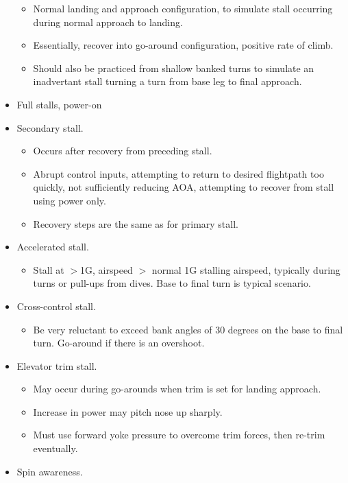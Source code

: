 \documentclass[letterpaper,10pt,titlepage]{article}
\begin{document}
\begin{itemize}
	  \begin{itemize}
	  \item Normal landing and approach configuration, to simulate stall occurring during normal approach
	        to landing.
	  \item Essentially, recover into go-around configuration, positive rate of climb.
	  \item Should also be practiced from shallow banked turns to simulate an
	        inadvertant stall turning a turn from base leg to final approach.
	  \end{itemize}
\item Full stalls, power-on
\item Secondary stall.
	  \begin{itemize}
	  \item Occurs after recovery from preceding stall.
	  \item Abrupt control inputs, attempting to return to desired flightpath too quickly,
	        not sufficiently reducing AOA, attempting to recover from stall using power only.
	  \item Recovery steps are the same as for primary stall.
	  \end{itemize}
\item Accelerated stall.
	  \begin{itemize}
	  \item Stall at $>$1G, airspeed $>$ normal 1G stalling airspeed, typically during turns or pull-ups from dives.
	        Base to final turn is typical scenario.
	  \end{itemize}
\item Cross-control stall.
	  \begin{itemize}
	  \item Be very reluctant to exceed bank angles of 30 degrees on the base to final turn.  Go-around if there is
	        an overshoot.
	  \end{itemize}
\item Elevator trim stall.
	  \begin{itemize}
	  \item May occur during go-arounds when trim is set for landing approach.
	  \item Increase in power may pitch nose up sharply.
	  \item Must use forward yoke pressure to overcome trim forces, then re-trim eventually.
	  \end{itemize}
\item Spin awareness.
	  \begin{itemize}

\end{itemize}
\end{itemize}
\end{document}
